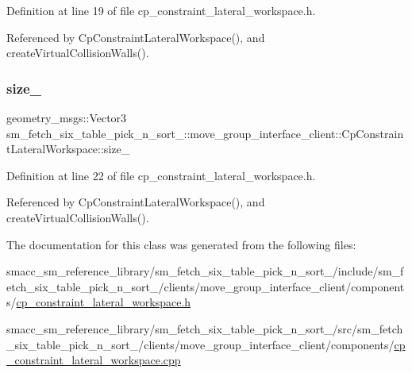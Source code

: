 Definition at line 19 of file cp\+\_\+constraint\+\_\+lateral\+\_\+workspace.\+h.



Referenced by Cp\+Constraint\+Lateral\+Workspace(), and create\+Virtual\+Collision\+Walls().

\mbox{\label{classsm__fetch__six__table__pick__n__sort__1_1_1move__group__interface__client_1_1CpConstraintLateralWorkspace_abcbeb3207f5e30503b9422654a3ec773}} 
\subsubsection{\texorpdfstring{size\+\_\+}{size\_}}
{\footnotesize\ttfamily geometry\+\_\+msgs\+::\+Vector3 sm\+\_\+fetch\+\_\+six\+\_\+table\+\_\+pick\+\_\+n\+\_\+sort\+\_\+::move\+\_\+group\+\_\+interface\+\_\+client\+::\+Cp\+Constraint\+Lateral\+Workspace\+::size\+\_\+\hspace{0.3cm}{\ttfamily [private]}}



Definition at line 22 of file cp\+\_\+constraint\+\_\+lateral\+\_\+workspace.\+h.



Referenced by Cp\+Constraint\+Lateral\+Workspace(), and create\+Virtual\+Collision\+Walls().



The documentation for this class was generated from the following files\+:\begin{DoxyCompactItemize}
\item 
smacc\+\_\+sm\+\_\+reference\+\_\+library/sm\+\_\+fetch\+\_\+six\+\_\+table\+\_\+pick\+\_\+n\+\_\+sort\+\_/include/sm\+\_\+fetch\+\_\+six\+\_\+table\+\_\+pick\+\_\+n\+\_\+sort\+\_/clients/move\+\_\+group\+\_\+interface\+\_\+client/components/\hyperlink{cp__constraint__lateral__workspace_8h}{cp\+\_\+constraint\+\_\+lateral\+\_\+workspace.\+h}\item 
smacc\+\_\+sm\+\_\+reference\+\_\+library/sm\+\_\+fetch\+\_\+six\+\_\+table\+\_\+pick\+\_\+n\+\_\+sort\+\_/src/sm\+\_\+fetch\+\_\+six\+\_\+table\+\_\+pick\+\_\+n\+\_\+sort\+\_/clients/move\+\_\+group\+\_\+interface\+\_\+client/components/\hyperlink{cp__constraint__lateral__workspace_8cpp}{cp\+\_\+constraint\+\_\+lateral\+\_\+workspace.\+cpp}\end{DoxyCompactItemize}
